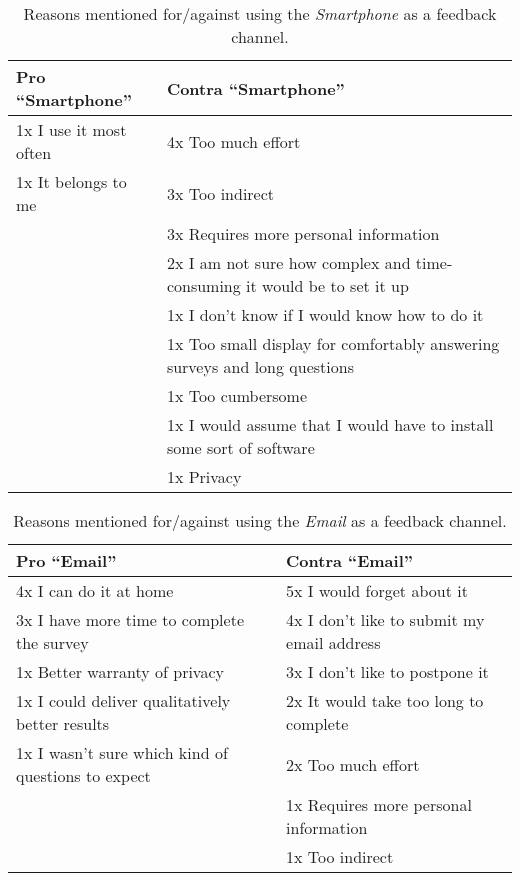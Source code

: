   \begin{table}[h]
    \small
    \center

    \begin{tabular}{p{7cm}p{7cm}}
    \toprule
    \textbf{Pro ``Smartphone''}  &  \textbf{Contra ``Smartphone''} \\ \midrule

    1x I use it most often  &  4x Too much effort \\
    1x It belongs to me  &  3x Too indirect \\
      &  3x Requires more personal information \\
      & 2x I am not sure how complex and time-consuming it would be to set it up \\
      &  1x I don't know if I would know how to do it \\
      &  1x Too small display for comfortably answering surveys and long questions \\
      &  1x Too cumbersome \\
      &  1x I would assume that I would have to install some sort of software \\
      &  1x Privacy \\

    \bottomrule
    \end{tabular}

    \caption[Feedback Channel - Smartphone]{Reasons mentioned for/against using the \textit{Smartphone} as a feedback channel.}
    \label{table:feedback-channel-smartphone}
  \end{table}



  \begin{table}[h]
    \small
    \center

    \begin{tabular}{p{7cm}p{7cm}}
    \toprule
    \textbf{Pro ``Email''}  &  \textbf{Contra ``Email''} \\ \midrule

    4x I can do it at home  &  5x I would forget about it  \\
    3x I have more time to complete the survey  &  4x I don't like to submit my email address  \\
    1x Better warranty of privacy  &  3x I don't like to postpone it  \\
    1x I could deliver qualitatively better results  &  2x It would take too long to complete  \\
    1x I wasn't sure which kind of questions to expect  &  2x Too much effort  \\
      &  1x Requires more personal information  \\
      &  1x Too indirect  \\

    \bottomrule
    \end{tabular}

    \caption[Feedback Channel - Email]{Reasons mentioned for/against using the \textit{Email} as a feedback channel.}
    \label{table:feedback-channel-email}
  \end{table}